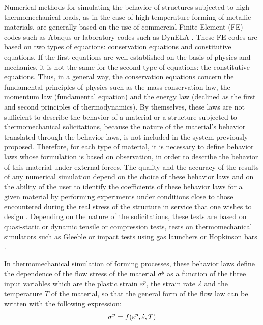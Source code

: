 \documentclass[algorithms,article,submit,pdftex,moreauthors]{Definitions/mdpi}
\DeclareRobustCommand{\mdot}[1]{\accentset{\mbox{\bfseries .}}{#1}}
\begin{document}
Numerical methods for simulating the behavior of structures subjected to high thermomechanical loads, as in the case of high-temperature forming of metallic materials, are generally based on the use of commercial Finite Element (FE) codes such as Abaqus or laboratory codes such as DynELA \cite{Pantale-2004}.
These FE codes are based on two types of equations: conservation equations and constitutive equations.
If the first equations are well established on the basis of physics and mechanics, it is not the same for the second type of equations: the constitutive equations.
Thus, in a general way, the conservation equations concern the fundamental principles of physics such as the mass conservation law, the momentum law (fundamental equation) and the energy law (declined as the first and second principles of thermodynamics).
By themselves, these laws are not sufficient to describe the behavior of a material or a structure subjected to thermomechanical solicitations, because the nature of the material’s behavior translated through the behavior laws, is not included in the system previously proposed.
Therefore, for each type of material, it is necessary to define behavior laws whose formulation is based on observation, in order to describe the behavior of this material under external forces.
The quality and the accuracy of the results of any numerical simulation depend on the choice of these behavior laws and on the ability of the user to identify the coefficients of these behavior laws for a given material by performing experiments under conditions close to those encountered during the real stress of the structure in service that one wishes to design \cite{Dey-2007}.
Depending on the nature of the solicitations, these tests are based on quasi-static or dynamic tensile or compression tests, tests on thermomechanical simulators such as Gleeble \cite{Lin-2009} or impact tests using gas launchers or Hopkinson bars \cite{Kolsky-1949}.

In thermomechanical simulation of forming processes, these behavior laws define the dependence \cite{Lee-2006} of the flow stress of the material $\sigma^y$ as a function of the three input variables which are the plastic strain $\varepsilon^p$, the strain rate $\mdot\varepsilon$ and the temperature $T$ of the material, so that the general form of the flow law can be written with the following expression:
\begin{equation}
\sigma^y = f\left(\varepsilon^p,\mdot\varepsilon,T\right)\label{eq:GenFlow}
\end{equation}
\end{document}
